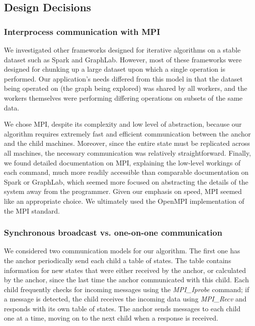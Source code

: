 \documentclass[11pt]{article}
\begin{document}
{\subsection{Design Decisions}

\subsubsection*{Interprocess communication with MPI}

We investigated other frameworks designed for iterative algorithms on a stable dataset such as Spark and GraphLab. However, most of these frameworks were designed for chunking up a large dataset upon which a single operation is performed. Our application's needs differed from this model in that the dataset being operated on (the graph being explored) was shared by all workers, and the workers themselves were performing differing operations on subsets of the same data.

We chose MPI, despite its complexity and low level of abstraction, because our algorithm requires extremely fast and efficient communication between the anchor and the child machines. Moreover, since the entire state must be replicated across all machines, the necessary communication was relatively straightforward. Finally, we found detailed documentation on MPI, explaining the low-level workings of each command, much more readily accessible than comparable documentation on Spark or GraphLab, which seemed more focused on abstracting the details of the system away from the programmer. Given our emphasis on speed, MPI seemed like an appropriate choice. We ultimately used the OpenMPI implementation of the MPI standard.

\subsubsection*{Synchronous broadcast vs. one-on-one communication}

We considered two communication models for our algorithm. The first one has the anchor periodically send each child a table of states. The table contains information for new states that were either received by the anchor, or calculated by the anchor, since the last time the anchor communicated with this child. Each child frequently checks for incoming messages using the \emph{MPI\_Iprobe} command; if a message is detected, the child receives the incoming data using \emph{MPI\_Recv} and responds with its own table of states. The anchor sends messages to each child one at a time, moving on to the next child when a response is received.

}
\end{document}
